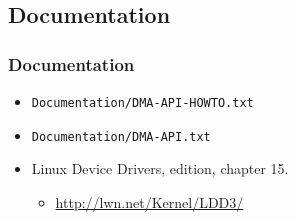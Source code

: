 \subsection{Documentation}

\begin{frame}
  \frametitle{Documentation}

  \begin{itemize}
  \item \lstinline|Documentation/DMA-API-HOWTO.txt|
  \item \lstinline|Documentation/DMA-API.txt|
  \item Linux Device Drivers,  edition, chapter 15.
    \begin{itemize}
    \item \url{http://lwn.net/Kernel/LDD3/}
    \end{itemize}
  \end{itemize}
\end{frame}
